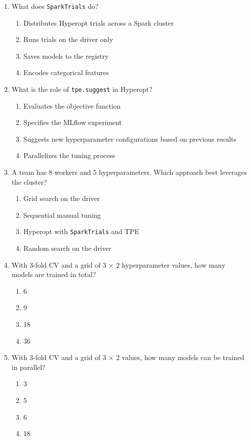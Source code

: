 \documentclass[11pt]{article}
\begin{document}
\begin{enumerate}[leftmargin=*, label=\textbf{Q\arabic*.}, start=58]
		\item What does \texttt{SparkTrials} do?
		\begin{enumerate}[label=(\alph*)]
			\item Distributes Hyperopt trials across a Spark cluster
			\item Runs trials on the driver only
			\item Saves models to the registry
			\item Encodes categorical features
		\end{enumerate}
		
		\item What is the role of \texttt{tpe.suggest} in Hyperopt?
		\begin{enumerate}[label=(\alph*)]
			\item Evaluates the objective function
			\item Specifies the MLflow experiment
			\item Suggests new hyperparameter configurations based on previous results
			\item Parallelizes the tuning process
		\end{enumerate}
		
		\item A team has 8 workers and 5 hyperparameters. Which approach best leverages the cluster?
		\begin{enumerate}[label=(\alph*)]
			\item Grid search on the driver
			\item Sequential manual tuning
			\item Hyperopt with \texttt{SparkTrials} and TPE
			\item Random search on the driver
		\end{enumerate}
		
		\item With 3-fold CV and a grid of 3 $\times$ 2 hyperparameter values, how many models are trained in total?
		\begin{enumerate}[label=(\alph*)]
			\item 6
			\item 9
			\item 18
			\item 36
		\end{enumerate}
		
		\item With 3-fold CV and a grid of 3 $\times$ 2 values, how many models can be trained in parallel?
		\begin{enumerate}[label=(\alph*)]
			\item 3
			\item 5
			\item 6
			\item 18
		\end{enumerate}
		

\end{enumerate}
\end{document}
